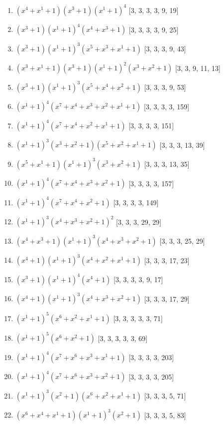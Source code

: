 \documentclass[10pt,twocolumn]{article}
\begin{document}
\begin{enumerate}
\item $(x^{4} + x^{1} + 1)(x^{3} + 1)(x^{1} + 1)^{4}$  [3, 3, 3, 3, 9, 19]
\item $(x^{3} + 1)(x^{1} + 1)^{4}(x^{4} + x^{3} + 1)$  [3, 3, 3, 3, 9, 25]
\item $(x^{3} + 1)(x^{1} + 1)^{3}(x^{5} + x^{3} + x^{1} + 1)$  [3, 3, 3, 9, 43]
\item $(x^{3} + x^{1} + 1)(x^{3} + 1)(x^{1} + 1)^{2}(x^{3} + x^{2} + 1)$  [3, 3, 9, 11, 13]
\item $(x^{3} + 1)(x^{1} + 1)^{3}(x^{5} + x^{4} + x^{2} + 1)$  [3, 3, 3, 9, 53]
\item $(x^{1} + 1)^{4}(x^{7} + x^{4} + x^{3} + x^{2} + x^{1} + 1)$  [3, 3, 3, 3, 159]
\item $(x^{1} + 1)^{4}(x^{7} + x^{4} + x^{2} + x^{1} + 1)$  [3, 3, 3, 3, 151]
\item $(x^{1} + 1)^{3}(x^{3} + x^{2} + 1)(x^{5} + x^{2} + x^{1} + 1)$  [3, 3, 3, 13, 39]
\item $(x^{5} + x^{1} + 1)(x^{1} + 1)^{3}(x^{3} + x^{2} + 1)$  [3, 3, 3, 13, 35]
\item $(x^{1} + 1)^{4}(x^{7} + x^{4} + x^{3} + x^{2} + 1)$  [3, 3, 3, 3, 157]
\item $(x^{1} + 1)^{4}(x^{7} + x^{4} + x^{2} + 1)$  [3, 3, 3, 3, 149]
\item $(x^{1} + 1)^{3}(x^{4} + x^{3} + x^{2} + 1)^{2}$  [3, 3, 3, 29, 29]
\item $(x^{4} + x^{3} + 1)(x^{1} + 1)^{3}(x^{4} + x^{3} + x^{2} + 1)$  [3, 3, 3, 25, 29]
\item $(x^{4} + 1)(x^{1} + 1)^{3}(x^{4} + x^{2} + x^{1} + 1)$  [3, 3, 3, 17, 23]
\item $(x^{3} + 1)(x^{1} + 1)^{4}(x^{4} + 1)$  [3, 3, 3, 3, 9, 17]
\item $(x^{4} + 1)(x^{1} + 1)^{3}(x^{4} + x^{3} + x^{2} + 1)$  [3, 3, 3, 17, 29]
\item $(x^{1} + 1)^{5}(x^{6} + x^{2} + x^{1} + 1)$  [3, 3, 3, 3, 3, 71]
\item $(x^{1} + 1)^{5}(x^{6} + x^{2} + 1)$  [3, 3, 3, 3, 3, 69]
\item $(x^{1} + 1)^{4}(x^{7} + x^{6} + x^{3} + x^{1} + 1)$  [3, 3, 3, 3, 203]
\item $(x^{1} + 1)^{4}(x^{7} + x^{6} + x^{3} + x^{2} + 1)$  [3, 3, 3, 3, 205]
\item $(x^{1} + 1)^{3}(x^{2} + 1)(x^{6} + x^{2} + x^{1} + 1)$  [3, 3, 3, 5, 71]
\item $(x^{6} + x^{4} + x^{1} + 1)(x^{1} + 1)^{3}(x^{2} + 1)$  [3, 3, 3, 5, 83]

\end{enumerate}
\end{document}
